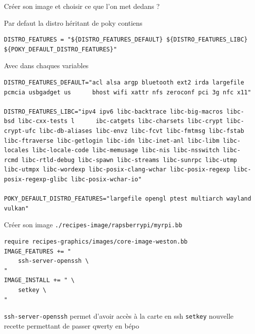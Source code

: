 \documentclass[compress]{smilebeamer}
\begin{document}
\begin{frame}
\begin{center}
\huge{Créer son image et choisir ce que l'on met dedans ?}
\end{center}
\end{frame}

\begin{frame}[fragile]
	Par defaut la distro héritant de poky contiens
	\begin{lstlisting}[style=bitbake]
DISTRO_FEATURES = "${DISTRO_FEATURES_DEFAULT} ${DISTRO_FEATURES_LIBC} ${POKY_DEFAULT_DISTRO_FEATURES}"
	\end{lstlisting}
	
\end{frame}

\begin{frame}[fragile]
	Avec dans chaques variables
	\begin{lstlisting}[style=bitbake]
DISTRO_FEATURES_DEFAULT="acl alsa argp bluetooth ext2 irda largefile pcmcia usbgadget us      bhost wifi xattr nfs zeroconf pci 3g nfc x11"
	
DISTRO_FEATURES_LIBC="ipv4 ipv6 libc-backtrace libc-big-macros libc-bsd libc-cxx-tests l      ibc-catgets libc-charsets libc-crypt libc-crypt-ufc libc-db-aliases libc-envz libc-fcvt libc-fmtmsg libc-fstab libc-ftraverse libc-getlogin libc-idn libc-inet-anl libc-libm libc-locales libc-locale-code libc-memusage libc-nis libc-nsswitch libc-rcmd libc-rtld-debug libc-spawn libc-streams libc-sunrpc libc-utmp libc-utmpx libc-wordexp libc-posix-clang-wchar libc-posix-regexp libc-posix-regexp-glibc libc-posix-wchar-io"
	
POKY_DEFAULT_DISTRO_FEATURES="largefile opengl ptest multiarch wayland vulkan"
	\end{lstlisting}
\end{frame}

\begin{frame}[fragile]
Créer son image \texttt{./recipes-image/rapsberrypi/myrpi.bb}
\begin{lstlisting}[style=bitbake]
require recipes-graphics/images/core-image-weston.bb
IMAGE_FEATURES += " 
    ssh-server-openssh \
"
IMAGE_INSTALL += " \
    setkey \
"
\end{lstlisting}
{\color[RGB]{232,120,0}\texttt{ssh-server-openssh}} permet d'avoir accès à la carte en ssh
{\color[RGB]{232,120,0}\texttt{setkey}} nouvelle recette permettant de passer qwerty en bépo
\end{frame}
\end{document}
